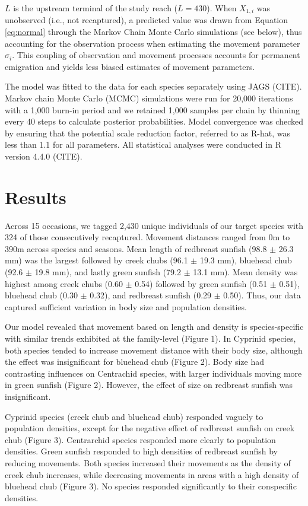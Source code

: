 \documentclass[11pt, class=article, crop=false]{standalone}
\begin{document}
$L$ is the upstream terminal of the study reach ($L = 430$). When $X_{1,i}$ was unobserved (i.e., not recaptured), a predicted value was drawn from Equation \ref{eq:normal} through the Markov Chain Monte Carlo simulations (see below), thus accounting for the observation process when estimating the movement parameter $\sigma_i$.
This coupling of observation and movement processes accounts for permanent emigration and yields less biased estimates of movement parameters.

The model was fitted to the data for each species separately using JAGS (CITE). Markov chain Monte Carlo (MCMC) simulations were run for 20,000 iterations with a 1,000 burn-in period and we retained 1,000 samples per chain by thinning every 40 steps to calculate posterior probabilities. Model convergence was checked by ensuring that the potential scale reduction factor, referred to as R-hat, was less than 1.1 for all parameters. All statistical analyses were conducted in R version 4.4.0 (CITE).

\section{Results}

Across 15 occasions, we tagged 2,430 unique individuals of our target species with 324 of those consecutively recaptured. Movement distances ranged from 0m to 390m across species and seasons. Mean length of redbreast sunfish (98.8 $\pm$ 26.3 mm) was the largest followed by creek chubs (96.1 $\pm$ 19.3 mm), bluehead chub (92.6 $\pm$ 19.8 mm), and lastly green sunfish (79.2 $\pm$ 13.1 mm). Mean density was highest among creek chubs (0.60 $\pm$ 0.54) followed by green sunfish (0.51 $\pm$ 0.51), bluehead chub (0.30 $\pm$ 0.32), and redbreast sunfish (0.29 $\pm$ 0.50). Thus, our data captured sufficient variation in body size and population densities. 

Our model revealed that movement based on length and density is species-specific with similar trends exhibited at the family-level (Figure 1). In Cyprinid species, both species tended to increase movement distance with their body size, although the effect was insignificant for bluehead chub (Figure 2). Body size had contrasting influences on Centrachid species, with larger individuals moving more in green sunfish (Figure 2). However, the effect of size on redbreast sunfish was insignificant.

Cyprinid species (creek chub and bluehead chub) responded vaguely to population densities, except for the negative effect of redbreast sunfish on creek chub (Figure 3). Centrarchid species responded more clearly to population densities. Green sunfish responded to high densities of redbreast sunfish by reducing movements. Both species increased their movements as the density of creek chub increases, while decreasing movements in areas with a high density of bluehead chub (Figure 3). No species responded significantly to their conspecific densities.
\end{document}
